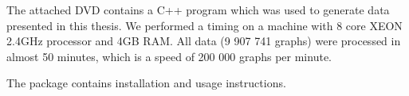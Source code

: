 
The attached DVD contains a C++ program which was used to generate data presented in this thesis. We performed a timing on a machine with 8 core XEON 2.4GHz processor and 4GB RAM. All data (9 907 741 graphs) were processed in almost 50 minutes, which is a speed of 200 000 graphs per minute.

The package contains installation and usage instructions.